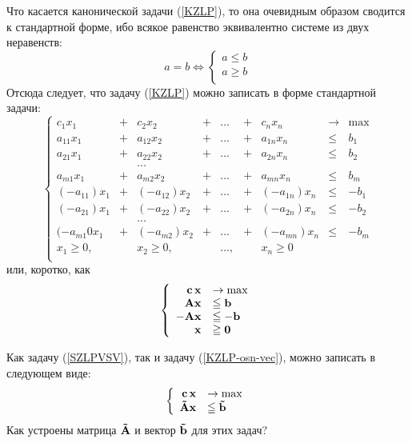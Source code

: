     Что касается канонической задачи (\ref{KZLP}), то она очевидным
    образом сводится к стандартной форме, ибо всякое
равенство эквивалентно системе из двух неравенств:
\[
a = b \Leftrightarrow \left\{ \begin{array}{l}
 a \leqslant b \\
 a \geqslant b \\
 \end{array} \right.
\]
    Отсюда следует, что задачу (\ref{KZLP}) можно записать в форме стандартной задачи:
    \begin{equation}\label{KZLP-osn}
\left\{
\begin{array}{rllllllll}
     c_1 x_1 & + & c_2 x_2 &+ & \ldots &+& c_n x_n &\to & \max\\
        a_{11} x_1 &+& a_{12} x_2  &+ &\ldots &+& a_{1n} x_n & \leqslant & b_1 \\
        a_{21} x_1 &+& a_{22} x_2  &+&\ldots &+& a_{2n} x_n & \leqslant & b_2\\
&&\ldots &&&&\\
        a_{m1} x_1 &+& a_{m2} x_2 &+& \ldots &+& a_{mn} x_n & \leqslant & b_m\\
        (-a_{11}) x_1 &+& (-a_{12}) x_2  &+ &\ldots &+& (-a_{1n}) x_n & \leqslant & -b_1 \\
        (-a_{21}) x_1 &+& (-a_{22}) x_2  &+&\ldots &+& (-a_{2n}) x_n & \leqslant & -b_2\\
&&\ldots &&&&\\
        (-a_{m1}0 x_1 &+& (-a_{m2}) x_2 &+& \ldots &+& (-a_{mn}) x_n & \leqslant & -b_m\\
        x_1 \geqslant 0, & & x_2 \geqslant 0, & & \ldots,& & x_n \geqslant 0\\
\end{array} \right.
\end{equation}
    или, коротко, как
\begin{equation}\label{KZLP-osn-vec}
\left\{
\begin{array}{rl}
 \mathbf{c} \, \mathbf{x} & \to \max  \\
 \mathbf{A} \mathbf{x} &\leqq \mathbf{b} \\
 \mathbf{-A} \mathbf{x} &\leqq \mathbf{-b} \\
 \mathbf{x} &\geqq \mathbf{0}\\
\end{array} \right.
\end{equation}


\begin{exer}
     Как задачу (\ref{SZLPVSV}), так и задачу (\ref{KZLP-osn-vec}),
     можно записать в следующем виде:
    \begin{equation*}\label{SZLPVSV-2}
\left\{
\begin{array}{rl}
 \mathbf{c} \, \mathbf{x} & \to \max  \\
 \mathbf{\tilde{A}} \mathbf{x} &\leqq \mathbf{\tilde{b}} \\
 \end{array} \right.
\end{equation*}
    Как устроены матрица $\mathbf{\tilde{A}}$ и вектор $\mathbf{\tilde{b}}$ для этих задач?
\end{exer}


